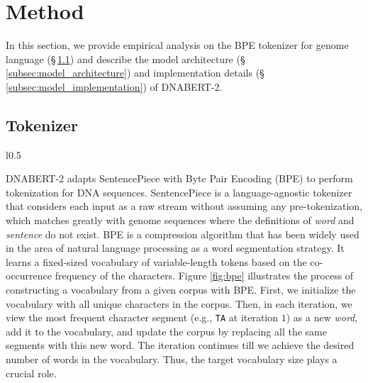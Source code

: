 \documentclass{article}
\begin{document}
\section{Method}
\label{sec:model}

In this section, we provide empirical analysis on the BPE tokenizer for genome language (\S\,\ref{subsec:model_tokenization}) and describe the model architecture (\S\,\ref{subsec:model_architecture}) and implementation details (\S\,\ref{subsec:model_implementation}) of DNABERT-2.

\subsection{Tokenizer}
\label{subsec:model_tokenization}

\begin{wrapfigure}{l}{0.5\textwidth}
    \centering
    \caption{Illustration of the BPE vocabulary constructions.}
    \label{fig:bpe}
\end{wrapfigure}


DNABERT-2 adapts SentencePiece \citep{sentencepiece} with Byte Pair Encoding (BPE) \citep{bpe} to perform tokenization for DNA sequences.
SentencePiece is a language-agnostic tokenizer that considers each input as a raw stream without assuming any pre-tokenization, which matches greatly with genome sequences where the definitions of \textit{word} and \textit{sentence} do not exist.
BPE is a compression algorithm that has been widely used in the area of natural language processing as a word segmentation strategy. It learns a fixed-sized vocabulary of variable-length tokens based on the co-occurrence frequency of the characters. 
Figure \ref{fig:bpe} illustrates the process of constructing a vocabulary from a given corpus with BPE. First, we initialize the vocabulary with all unique characters in the corpus. Then, in each iteration, we view the most frequent character segment (e.g., \texttt{TA} at iteration $1$) as a new \textit{word}, add it to the vocabulary, and update the corpus by replacing all the same segments with this new word. The iteration continues till we achieve the desired number of words in the vocabulary. Thus, the target vocabulary size plays a crucial role.
\end{document}
